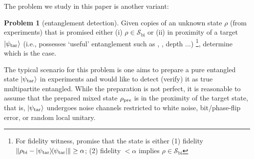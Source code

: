 \documentclass[
aps,
pra,
twocolumn,
floatfix,
]{revtex4-2}
\theoremstyle{plain}
\theoremstyle{definition}
\newtheorem{problem}{Problem}
\newcommand{\dm}{\rho}
\newcommand{\bi}{\text{bi}}
\newcommand{\target}{\textup{tar}}
\newcommand{\prepare}{\textup{pre}}
\newcommand{\separable}{\mathcal{S}}
\newcommand{\ppartition}{\mathcal{P}}
\begin{document}
The problem we study in this paper is another variant:
\begin{problem}[entanglement detection]\label{prm:entanglement_detection}
	Given copies of an unknown state $\dm$ (from experiments) that is promised either (i) $\dm\in\separable_{\bi}$
	or (ii) in proximity of a target $\ket{\psi_{\target}}$ (i.e., possesses `useful' entanglement such as , , depth ...) 
	\footnote{
		For fidelity witness, promise that the state is either 
		(1) fidelity $\norm{\dm_{\bi}-\op{\psi_\target}}\ge \alpha$; 
		(2) fidelity $< \alpha$ implies $\dm\in\separable_{\bi}$
	},
	determine which is the case.
\end{problem}
The typical scenario for this problem is one aims to prepare a pure entangled state $\ket{\psi_\target}$ in experiments and would like to detect (verify) it as true multipartite entangled. 
While the preparation is not perfect, 
it is reasonable to assume that the prepared mixed state $\dm_{\prepare}$ is in the proximity of the target state,
that is, $\ket{\psi_{\target}}$ undergoes noise channels restricted to white noise, bit/phase-flip error, or random local unitary.
\end{document}
